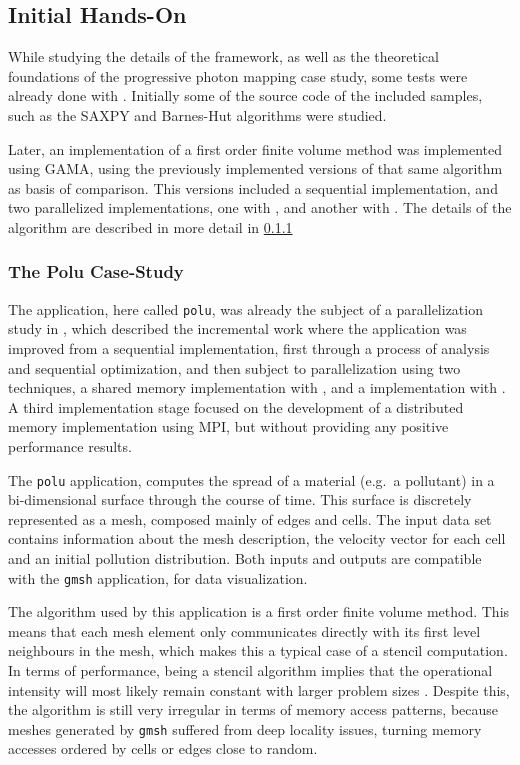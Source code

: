 \documentclass[main.tex]{subfiles}
\begin{document}
\subsection{Initial \gama Hands-On}

While studying the details of the framework, as well as the theoretical foundations of the progressive photon mapping case study, some tests were already done with \gama. Initially some of the source code of the included samples, such as the SAXPY and Barnes-Hut algorithms were studied.

Later, an implementation of a first order finite volume method was implemented using GAMA, using the previously implemented versions of that same algorithm as basis of comparison. This versions included a sequential implementation, and two parallelized implementations, one with \openmp, and another with \cuda. The details of the algorithm are described in more detail in \cref{sec:polu}

\subsubsection{The Polu Case-Study} \label{sec:polu}

The application, here called \texttt{polu}, was already the subject of a parallelization study in \cite{naps2012}, which described the incremental work where the application was improved from a sequential implementation, first through a process of analysis and sequential optimization, and then subject to parallelization using two techniques, a shared memory \cpu implementation with \openmp, and a \gpu implementation with \cuda. A third implementation stage focused on the development of a distributed memory implementation using \acs{MPI}, but without providing any positive performance results.

The \texttt{polu} application, computes the spread of a material (e.g.\ a pollutant) in a bi-dimensional surface through the course of time. This surface is discretely represented as a mesh, composed mainly of edges and cells. The input data set contains information about the mesh description, the velocity vector for each cell and an initial pollution distribution.
Both inputs and outputs are compatible with the \texttt{gmsh} application, for data visualization.


The algorithm used by this application is a first order finite volume method. This means that each mesh element only communicates directly with its first level neighbours in the mesh, which makes this a typical case of a stencil computation. In terms of performance, being a stencil algorithm implies that the operational intensity will most likely remain constant with larger problem sizes \cite{williams2009roofline,williams2010roofline}. Despite this, the algorithm is still very irregular in terms of memory access patterns, because meshes generated by \texttt{gmsh} suffered from deep locality issues, turning memory accesses ordered by cells or edges close to random.
\end{document}
